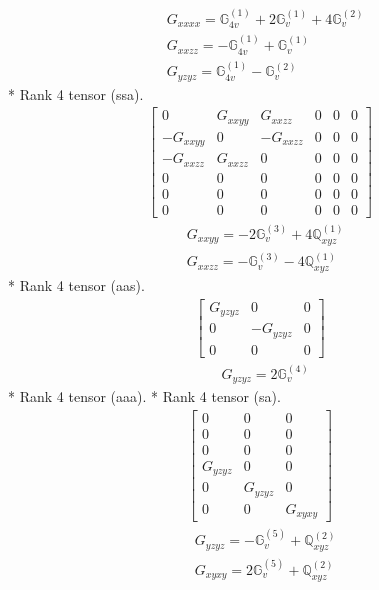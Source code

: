 \documentclass[fleqn,8pt,landscape]{jsarticle}
\begin{document}
\begin{align*}
& G_{xxxx} = \mathbb{G}_{4v}^{(1)} + 2 \mathbb{G}_{v}^{(1)} + 4 \mathbb{G}_{v}^{(2)} \\
& G_{xxzz} = - \mathbb{G}_{4v}^{(1)} + \mathbb{G}_{v}^{(1)} \\
& G_{yzyz} = \mathbb{G}_{4v}^{(1)} - \mathbb{G}_{v}^{(2)}
\end{align*}
* Rank 4 tensor (ssa).
\begin{align*}
\begin{bmatrix} 0 & G_{xxyy} & G_{xxzz} & 0 & 0 & 0 \\ - G_{xxyy} & 0 & - G_{xxzz} & 0 & 0 & 0 \\ - G_{xxzz} & G_{xxzz} & 0 & 0 & 0 & 0 \\ 0 & 0 & 0 & 0 & 0 & 0 \\ 0 & 0 & 0 & 0 & 0 & 0 \\ 0 & 0 & 0 & 0 & 0 & 0 \end{bmatrix}
\end{align*}
\begin{align*}
& G_{xxyy} = - 2 \mathbb{G}_{v}^{(3)} + 4 \mathbb{Q}_{xyz}^{(1)} \\
& G_{xxzz} = - \mathbb{G}_{v}^{(3)} - 4 \mathbb{Q}_{xyz}^{(1)}
\end{align*}
* Rank 4 tensor (aas).
\begin{align*}
\begin{bmatrix} G_{yzyz} & 0 & 0 \\ 0 & - G_{yzyz} & 0 \\ 0 & 0 & 0 \end{bmatrix}
\end{align*}
\begin{align*}
& G_{yzyz} = 2 \mathbb{G}_{v}^{(4)}
\end{align*}
* Rank 4 tensor (aaa).
* Rank 4 tensor (sa).
\begin{align*}
\begin{bmatrix} 0 & 0 & 0 \\ 0 & 0 & 0 \\ 0 & 0 & 0 \\ G_{yzyz} & 0 & 0 \\ 0 & G_{yzyz} & 0 \\ 0 & 0 & G_{xyxy} \end{bmatrix}
\end{align*}
\begin{align*}
& G_{yzyz} = - \mathbb{G}_{v}^{(5)} + \mathbb{Q}_{xyz}^{(2)} \\
& G_{xyxy} = 2 \mathbb{G}_{v}^{(5)} + \mathbb{Q}_{xyz}^{(2)}
\end{align*}
\end{document}
